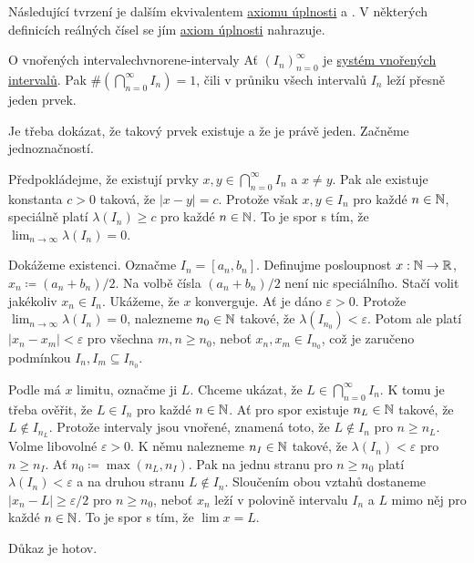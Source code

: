 Následující tvrzení je dalším ekvivalentem \hyperref[prop:axiom-uplnosti]{axiomu
úplnosti} a . V některých definicích reálných
čísel se jím \hyperref[prop:axiom-uplnosti]{axiom úplnosti} nahrazuje.

\begin{proposition}{O vnořených intervalech}{vnorene-intervaly}
 Ať $(I_n)_{n=0}^{\infty}$ je \hyperref[def:system-vnorenych-intervalu]{systém
 vnořených intervalů}. Pak $\# (\bigcap_{n=0}^{\infty} I_n) = 1$, čili v průniku
 všech intervalů $I_n$ leží přesně jeden prvek.
\end{proposition}
\begin{propproof}
 Je třeba dokázat, že takový prvek existuje a že je právě jeden. Začněme
 jednoznačností.

 Předpokládejme, že existují prvky $x,y \in \bigcap_{n=0}^{\infty} I_n$ a $x
 \neq y$. Pak ale existuje konstanta $c>0$ taková, že $|x-y| = c$. Protože však
 $x,y \in I_n$ pro každé $n \in \mathbb{N}$, speciálně platí $\lambda(I_n) \geq c$ pro
 každé $n \in \mathbb{N}$. To je spor s tím, že $\lim_{n \to \infty} \lambda(I_n) = 0$.

 Dokážeme existenci. Označme $I_n = [a_n,b_n]$. Definujme posloupnost $x:\mathbb{N} \to
 \mathbb{R}$, $x_n \coloneqq (a_n + b_n) / 2$. Na volbě čísla $(a_n + b_n) / 2$ není nic
 speciálního. Stačí volit jakékoliv $x_n \in I_n$. Ukážeme, že $x$ konverguje.
 Ať je dáno $\varepsilon>0$. Protože $\lim_{n \to \infty} \lambda(I_n) = 0$,
 nalezneme $n_0 \in \mathbb{N}$ takové, že $\lambda(I_{n_0})<\varepsilon$. Potom ale
 platí $|x_n-x_m|<\varepsilon$ pro všechna $m,n \geq n_0$, neboť $x_n,x_m \in
 I_{n_0}$, což je zaručeno podmínkou $I_n,I_m \subseteq I_{n_0}$.

 Podle  má $x$ limitu, označme ji $L$. Chceme
 ukázat, že $L \in \bigcap_{n=0}^{\infty}I_n$. K tomu je třeba ověřit, že $L \in
 I_n$ pro každé $n \in \mathbb{N}$. Ať pro spor existuje $n_L \in \mathbb{N}$ takové, že $L
 \notin I_{n_L}$. Protože intervaly jsou vnořené, znamená toto, že $L \notin
 I_n$ pro $n \geq n_L$. Volme libovolné $\varepsilon>0$. K němu nalezneme $n_I
 \in \mathbb{N}$ takové, že $\lambda(I_n)<\varepsilon$ pro $n \geq n_I$. Ať $n_0
 \coloneqq \max(n_L,n_I)$. Pak na jednu stranu pro $n \geq n_0$ platí
 $\lambda(I_n)<\varepsilon$ a na druhou stranu $L \notin I_n$. Sloučením obou
 vztahů dostaneme $|x_n-L| \geq \varepsilon / 2$ pro $n \geq n_0$, neboť $x_n$
 leží v polovině intervalu $I_n$ a $L$ mimo něj pro každé $n \in \mathbb{N}$. To je spor
 s tím, že $\lim x = L$.

 Důkaz je hotov.
\end{propproof}

